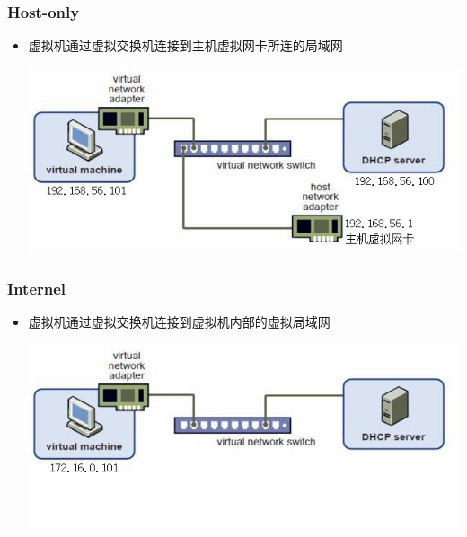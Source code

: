\documentclass[xcolor=svgnames,presentation]{beamer}
\begin{document}
\begin{frame}
\frametitle{Host-only}
\label{sec-3-3-3}
\begin{itemize}

\item 虚拟机通过虚拟交换机连接到主机虚拟网卡所连的局域网
\label{sec-3-3-3-1}%
\begin{center}
\includegraphics[width=.9\linewidth]{img/host-only.jpg}
\end{center}

\end{itemize} %
\end{frame}
\begin{frame}
\frametitle{Internel}
\label{sec-3-3-4}
\begin{itemize}

\item 虚拟机通过虚拟交换机连接到虚拟机内部的虚拟局域网
\label{sec-3-3-4-1}%
\begin{center}
\includegraphics[width=.9\linewidth]{img/internal.jpg}
\end{center}

\end{itemize} %
\end{frame}
\end{document}
